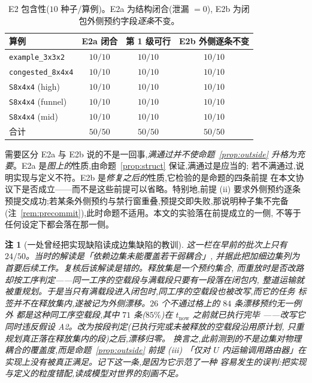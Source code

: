 \documentclass[manuscript,screen,review]{acmart}
\newcommand{\NSeeds}{10}
\newcommand{\NPairs}{50}
\newcommand{\PassClosed}{\NPairs/\NPairs}    %
\newcommand{\PassInvar}{\NPairs/\NPairs}     %
\newtheorem{remark}{注}
\begin{document}
\begin{table}[t]
\centering
\caption{E2 包含性(\(\NSeeds\) 种子/算例)。E2a 为结构闭合(泄漏 \(=0\)),
E2b 为闭包外侧预约字段\emph{逐条}不变。}
\label{tab:e2}
\small
\begin{tabular}{@{}lccc@{}}
\toprule
算例 & E2a 闭合 & 第 1 级可行 & E2b 外侧逐条不变 \\
\midrule
\texttt{example\_3x3x2}   & \(10/10\) & \(10/10\) & \(10/10\) \\
\texttt{congested\_8x4x4} & \(10/10\) & \(10/10\) & \(10/10\) \\
\texttt{S8x4x4} (high)    & \(10/10\) & \(10/10\) & \(10/10\) \\
\texttt{S8x4x4} (funnel)  & \(10/10\) & \(10/10\) & \(10/10\) \\
\texttt{S8x4x4} (mid)     & \(10/10\) & \(10/10\) & \(10/10\) \\
\midrule
合计 & \(\PassClosed\) & \(\NPairs/\NPairs\) & \(\PassInvar\) \\
\bottomrule
\end{tabular}
\end{table}

需要区分 E2a 与 E2b 说的不是一回事,\emph{满通过并不使命题~\ref{prop:outside}
升格为充要}。E2a 是\emph{图上的}性质,由命题~\ref{prop:struct} 保证,满通过是应当的;
若不满通过,说明实现与定义不符。E2b 是\emph{修复之后的}性质,它检验的是命题的四条前提
在本文协议下是否成立——而不是这些前提可以省略。特别地,前提 (ii) 要求外侧预约逐条
预提交成功;若某条外侧预约与禁行窗重叠,预提交即失败,那说明种子集不完备
(注~\ref{rem:precommit}),此时命题不适用。本文的实验落在前提成立的一侧,
不等于任何设定下都会落在那一侧。

\begin{remark}[一处曾经把实现缺陷读成边集缺陷的教训]
\label{rem:e2b_history}
这一栏在早前的批次上只有 \(24/\NPairs\)。当时的解读是「依赖边集未能覆盖若干弱耦合」,
并据此把加细边集列为首要后续工作。复核后该解读是错的。释放集是一个\emph{预约}集合,
而重放时是否改路却按\emph{工序}判定——同一工序的空载段与满载段只要有一段落在闭包内,
整道运输就被重规划。于是当只有满载段进入闭包时,同工序的空载段也被改写,而它的任务
标签并不在释放集内,遂被记为外侧漂移。\(26\) 个不通过格上的 \(84\) 条漂移预约无一例外
都是这种同工序空载段,其中 \(71\) 条(\(85\%\))在 \(t_{\mathrm{now}}\) 之前就已执行完毕
——改写它同时违反假设 A2。改为按\emph{段}判定(已执行完或未被释放的空载段沿用原计划,
只重规划真正落在释放集内的段)之后,漂移归零。
换言之,此前测到的不是边集对物理耦合的覆盖度,而是命题~\ref{prop:outside} 前提 (iii)
「仅对 \(U\) 内运输调用路由器」在实现上没有被真正满足。记下这一条,是因为它示范了一种
容易发生的误判:把实现与定义的粒度错配,读成模型对世界的刻画不足。
\end{remark}
\end{document}
